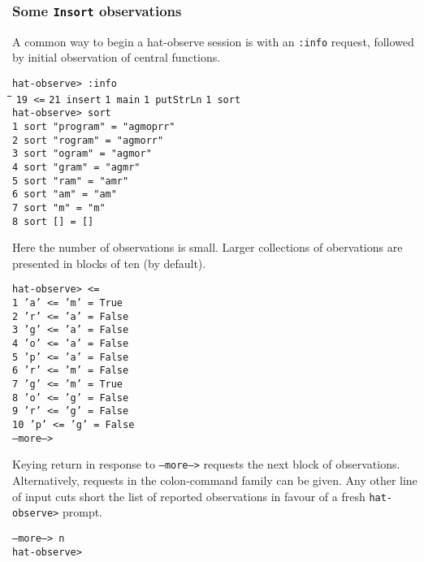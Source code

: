 \documentclass[12pt]{article}
\newcommand{\mkblue}[1]{#1}
\begin{document}
\subsubsection*{Some {\tt Insort} observations}
A common way to begin a hat-observe session is with an {\tt :info}
request, followed by initial observation of central functions.
\begin{tabbing}
{\tt hat-observe> :info} \\
\hspace{2.5cm}\=\hspace{2.5cm}\=\hspace{2.5cm}\=\hspace{2.5cm}\=\kill
{\tt 19 <=}       \> {\tt 21 insert}        \> {\tt 1 main}   \>
{\tt 1 putStrLn}  \> {\tt 1 sort} \\
{\tt hat-observe> sort} \\
{\tt \mkblue{1} sort "program" = "agmoprr"} \\
{\tt \mkblue{2} sort "rogram" = "agmorr"} \\
{\tt \mkblue{3} sort "ogram" = "agmor"} \\
{\tt \mkblue{4} sort "gram" = "agmr"} \\
{\tt \mkblue{5} sort "ram" = "amr"} \\
{\tt \mkblue{6} sort "am" = "am"} \\
{\tt \mkblue{7} sort "m" = "m"} \\
{\tt \mkblue{8} sort [] = []}
\end{tabbing}
Here the number of observations is small.  Larger collections of
obervations are presented in blocks of ten (by default).
\begin{tabbing}
{\tt hat-observe> <=} \\
{\tt \mkblue{1} 'a' <= 'm' = True} \\
{\tt \mkblue{2} 'r' <= 'a' = False} \\
{\tt \mkblue{3} 'g' <= 'a' = False} \\
{\tt \mkblue{4} 'o' <= 'a' = False} \\
{\tt \mkblue{5} 'p' <= 'a' = False} \\
{\tt \mkblue{6} 'r' <= 'm' = False} \\
{\tt \mkblue{7} 'g' <= 'm' = True} \\
{\tt \mkblue{8} 'o' <= 'g' = False} \\
{\tt \mkblue{9} 'r' <= 'g' = False} \\
{\tt \mkblue{10} 'p' <= 'g' = False} \\
{\tt --more--> }
\end{tabbing}
Keying return in response to {\tt --more-->} requests the next block of
observations.  Alternatively, requests in the colon-command family can
be given.  Any other line of input cuts
short the list of reported observations in favour of a fresh {\tt hat-observe>}
prompt.
\begin{tabbing}
{\tt --more--> n} \\
{\tt hat-observe>}
\end{tabbing}
\end{document}
